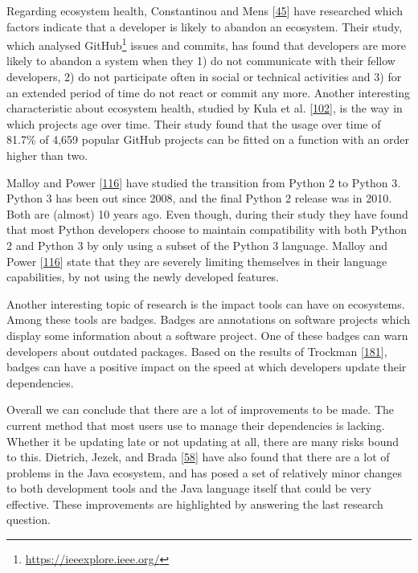 \documentclass[]{book}
\let\rmarkdownfootnote\footnote%
\def\footnote{\protect\rmarkdownfootnote}
\begin{document}
Regarding ecosystem health, Constantinou and Mens
{[}\protect\hyperlink{ref-Constantinou2017}{45}{]} have researched which
factors indicate that a developer is likely to abandon an ecosystem.
Their study, which analysed GitHub\footnote{\url{https://ieeexplore.ieee.org/}}
issues and commits, has found that developers are more likely to abandon
a system when they 1) do not communicate with their fellow developers,
2) do not participate often in social or technical activities and 3) for
an extended period of time do not react or commit any more. Another
interesting characteristic about ecosystem health, studied by Kula et
al. {[}\protect\hyperlink{ref-Kula2017-2}{102}{]}, is the way in which
projects age over time. Their study found that the usage over time of
81.7\% of 4,659 popular GitHub projects can be fitted on a function with
an order higher than two.

Malloy and Power {[}\protect\hyperlink{ref-Malloy2018}{116}{]} have
studied the transition from Python 2 to Python 3. Python 3 has been out
since 2008, and the final Python 2 release was in 2010. Both are
(almost) 10 years ago. Even though, during their study they have found
that most Python developers choose to maintain compatibility with both
Python 2 and Python 3 by only using a subset of the Python 3 language.
Malloy and Power {[}\protect\hyperlink{ref-Malloy2018}{116}{]} state
that they are severely limiting themselves in their language
capabilities, by not using the newly developed features.

Another interesting topic of research is the impact tools can have on
ecosystems. Among these tools are badges. Badges are annotations on
software projects which display some information about a software
project. One of these badges can warn developers about outdated
packages. Based on the results of Trockman
{[}\protect\hyperlink{ref-Trockman2018}{181}{]}, badges can have a
positive impact on the speed at which developers update their
dependencies.

Overall we can conclude that there are a lot of improvements to be made.
The current method that most users use to manage their dependencies is
lacking. Whether it be updating late or not updating at all, there are
many risks bound to this. Dietrich, Jezek, and Brada
{[}\protect\hyperlink{ref-Dietrich2014}{58}{]} have also found that
there are a lot of problems in the Java ecosystem, and has posed a set
of relatively minor changes to both development tools and the Java
language itself that could be very effective. These improvements are
highlighted by answering the last research question.
\end{document}
